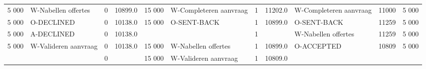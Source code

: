\begin{tabular}{rlrlrlrllll}
5 000 & W-Nabellen offertes & 0 & 10899.0 & 15 000 & W-Completeren aanvraag & 1 & 11202.0 & W-Completeren aanvraag & 11000 & 5 000 \\
5 000 & O-DECLINED & 0 & 10138.0 & 15 000 & O-SENT-BACK & 1 & 10899.0 & O-SENT-BACK & 11259 & 5 000 \\
5 000 & A-DECLINED & 0 & 10138.0 &  &  & 1 &  & W-Nabellen offertes & 11259 & 5 000 \\
5 000 & W-Valideren aanvraag & 0 & 10138.0 & 15 000 & W-Nabellen offertes & 1 & 10899.0 & O-ACCEPTED & 10809 & 5 000 \\
 &  & 0 &  & 15 000 & W-Valideren aanvraag & 1 & 10809.0 &  &  &  \\
\bottomrule
\end{tabular}
